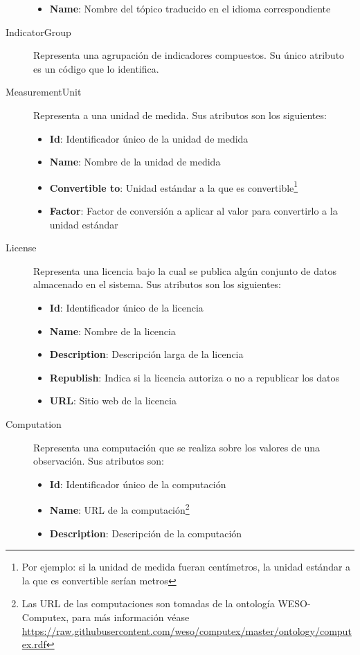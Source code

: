 \begin{description}
\begin{itemize}
			\item \textbf{Name}:  Nombre del tópico traducido en el idioma correspondiente
		\end{itemize}
	\item[IndicatorGroup]  Representa una agrupación de indicadores compuestos.  Su único atributo es un código que lo identifica.
	\item[MeasurementUnit]  Representa a una unidad de medida.  Sus atributos son los siguientes:
		\begin{itemize}
			\item \textbf{Id}:  Identificador único de la unidad de medida
			\item \textbf{Name}:  Nombre de la unidad de medida
			\item \textbf{Convertible to}:  Unidad estándar a la que es convertible\footnote{Por ejemplo: si la unidad de medida fueran centímetros, la unidad estándar a la que es convertible serían metros}
			\item \textbf{Factor}:  Factor de conversión a aplicar al valor para convertirlo a la unidad estándar
		\end{itemize}
	\item[License]  Representa una licencia bajo la cual se publica algún conjunto de datos almacenado en el sistema.  Sus atributos son los siguientes:
		\begin{itemize}
			\item \textbf{Id}:  Identificador único de la licencia
			\item \textbf{Name}:  Nombre de la licencia
			\item \textbf{Description}:  Descripción larga de la licencia
			\item \textbf{Republish}:  Indica si la licencia autoriza o no a republicar los datos
			\item \textbf{URL}:  Sitio web de la licencia
		\end{itemize}
	\item[Computation]  Representa una computación que se realiza sobre los valores de una observación.  Sus atributos son:
		\begin{itemize}
			\item \textbf{Id}:  Identificador único de la computación
			\item \textbf{Name}:  URL de la computación\footnote{Las URL de las computaciones son tomadas de la ontología WESO-Computex, para más información véase \url{https://raw.githubusercontent.com/weso/computex/master/ontology/computex.rdf}}
			\item \textbf{Description}:  Descripción de la computación

\end{itemize}
\end{description}
